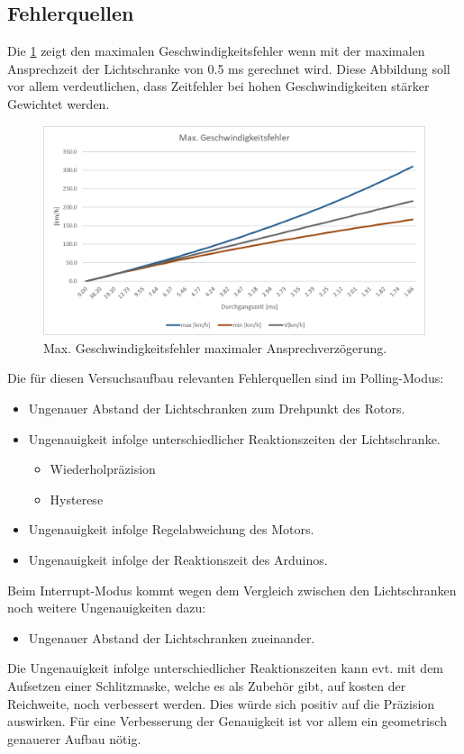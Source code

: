 \clearpage
\subsection{Fehlerquellen}
Die \ref{fig:AuswertungZeitfehler} zeigt den maximalen Geschwindigkeitsfehler wenn mit der maximalen Ansprechzeit der Lichtschranke von 0.5 ms gerechnet wird. Diese Abbildung soll vor allem verdeutlichen, dass Zeitfehler bei hohen Geschwindigkeiten stärker Gewichtet werden.

\begin{figure}[ht]
    \centering
    \includegraphics[width=\textwidth]{images/Zeitfehler.png}
    \caption{Max. Geschwindigkeitsfehler maximaler Ansprechverzögerung.}
    \label{fig:AuswertungZeitfehler}
\end{figure}

Die für diesen Versuchsaufbau relevanten Fehlerquellen sind im Polling-Modus:
\begin{itemize}
    \item Ungenauer Abstand der Lichtschranken zum Drehpunkt des Rotors.
    \item Ungenauigkeit infolge unterschiedlicher Reaktionszeiten der Lichtschranke.
    \begin{itemize}
        \item Wiederholpräzision
        \item Hysterese
    \end{itemize}
    \item Ungenauigkeit infolge Regelabweichung des Motors.
    \item Ungenauigkeit infolge der Reaktionszeit des Arduinos.
\end{itemize}

Beim Interrupt-Modus kommt wegen dem Vergleich zwischen den Lichtschranken noch weitere Ungenauigkeiten dazu:
\begin{itemize}
    \item Ungenauer Abstand der Lichtschranken zueinander.
\end{itemize}
Die Ungenauigkeit infolge unterschiedlicher Reaktionszeiten kann evt. mit dem Aufsetzen einer Schlitzmaske, welche es als Zubehör gibt, auf kosten der Reichweite, noch verbessert werden. Dies würde sich positiv auf die Präzision auswirken. Für eine Verbesserung der Genauigkeit ist vor allem ein geometrisch genauerer Aufbau nötig. \\

